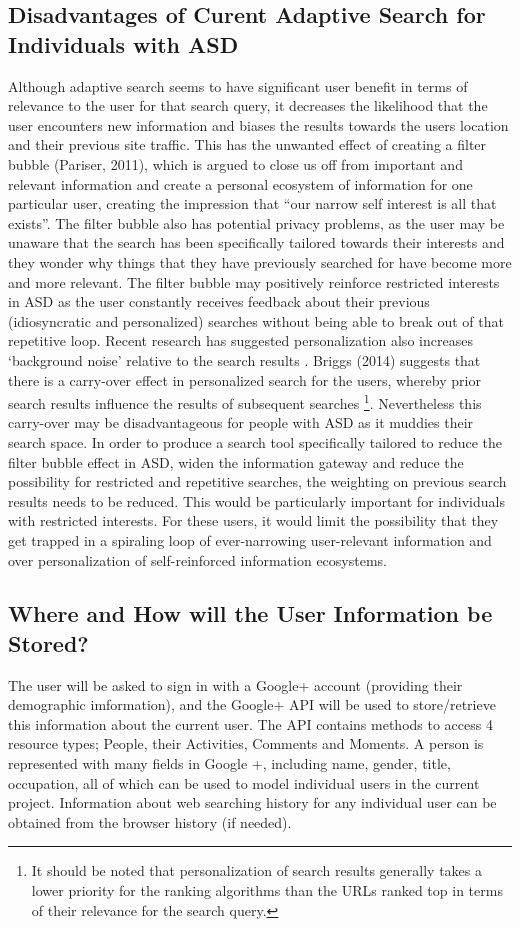 \documentclass[10pt]{article}
\begin{document}
\subsection{Disadvantages of Curent Adaptive Search for Individuals with ASD}
Although adaptive search seems to have significant user benefit in terms of relevance to the user for that search query, it decreases the likelihood that the user encounters new information and biases the results towards the users location and their previous site traffic.  This has the unwanted effect of creating a filter bubble (Pariser, 2011), which is argued to close us off from important and relevant information and create a personal ecosystem of information for one particular user, creating the impression that “our narrow self interest is all that exists”. The filter bubble also has potential privacy problems, as the user may be unaware that the search has been specifically tailored towards their interests and they wonder why things that they have previously searched for have become more and more relevant. The filter bubble may positively reinforce restricted interests in ASD as the user constantly receives feedback about their previous (idiosyncratic and personalized) searches without being able to break out of that repetitive loop. 
Recent research has suggested personalization also increases ‘background noise’ relative to the search results \cite{briggs}. Briggs (2014) suggests that there is a carry-over effect in personalized search for the users, whereby prior search results influence the results of subsequent searches \footnote{It should be noted that personalization of search results generally takes a lower priority for the ranking algorithms than the URLs ranked top in terms of their relevance for the search query.}.  Nevertheless this carry-over may be disadvantageous for people with ASD as it muddies their search space.
In order to produce a search tool specifically tailored to reduce the filter bubble effect in ASD, widen the information gateway and reduce the possibility for restricted and repetitive searches, the weighting on previous search results needs to be reduced. This would be particularly important for individuals with restricted interests. For these users, it would limit the possibility that they get trapped in a spiraling loop of ever-narrowing user-relevant information and over personalization of self-reinforced information ecosystems.

\subsection{Where and How will the User Information be Stored?}
The user will be asked to sign in with a Google+ account (providing their demographic imformation), and the Google+ API will be used to store/retrieve this information about the current user. The API contains methods to access 4 resource  types; People, their Activities, Comments and Moments. A person is represented with many fields in Google +, including name, gender, title, occupation, all of which can be used to model individual users in the current project. Information about web searching history for any individual user can be obtained from the browser history (if needed). 
\end{document}
